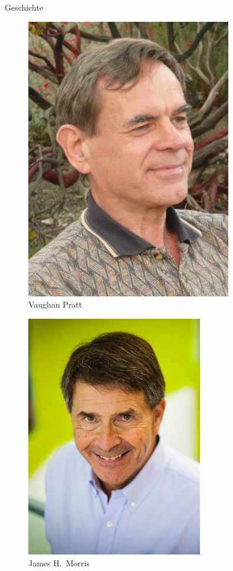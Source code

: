 \documentclass[xcolor=dvipsnames, aspectratio=169]{beamer}
\begin{document}
\begin{frame}{Geschichte}
\begin{minipage}{0.3\textwidth}
\begin{figure}
\includegraphics[width=0.8\textwidth]{pratt}
\caption{Vaughan Pratt}
\end{figure}
\end{minipage}
\hfill
\begin{minipage}{0.3\textwidth}
\begin{figure}
\includegraphics[width=.8\textwidth]{morris}
\caption{James H.\ Morris}
\end{figure}
\end{minipage}
\end{frame}
\end{document}
